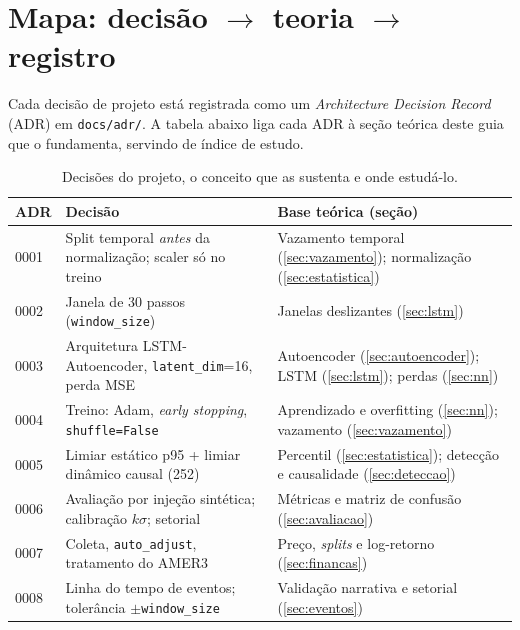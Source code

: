 \section{Mapa: decisão $\to$ teoria $\to$ registro}
\label{sec:mapa}

Cada decisão de projeto está registrada como um \emph{Architecture Decision
Record} (ADR) em \texttt{docs/adr/}. A tabela abaixo liga cada ADR à seção
teórica deste guia que o fundamenta, servindo de índice de estudo.

\begin{table}[h]
\centering
\caption{Decisões do projeto, o conceito que as sustenta e onde estudá-lo.}
\label{tab:mapa}
\renewcommand{\arraystretch}{1.25}
\begin{tabular}{p{1.4cm} p{6.2cm} p{5.2cm}}
\toprule
\textbf{ADR} & \textbf{Decisão} & \textbf{Base teórica (seção)} \\
\midrule
0001 & Split temporal \emph{antes} da normalização; scaler só no treino &
Vazamento temporal (\ref{sec:vazamento}); normalização (\ref{sec:estatistica}) \\
0002 & Janela de 30 passos (\texttt{window\_size}) &
Janelas deslizantes (\ref{sec:lstm}) \\
0003 & Arquitetura LSTM-Autoencoder, \texttt{latent\_dim}=16, perda MSE &
Autoencoder (\ref{sec:autoencoder}); LSTM (\ref{sec:lstm}); perdas (\ref{sec:nn}) \\
0004 & Treino: Adam, \emph{early stopping}, \texttt{shuffle=False} &
Aprendizado e overfitting (\ref{sec:nn}); vazamento (\ref{sec:vazamento}) \\
0005 & Limiar estático p95 + limiar dinâmico causal (252) &
Percentil (\ref{sec:estatistica}); detecção e causalidade (\ref{sec:deteccao}) \\
0006 & Avaliação por injeção sintética; calibração $k\sigma$; setorial &
Métricas e matriz de confusão (\ref{sec:avaliacao}) \\
0007 & Coleta, \texttt{auto\_adjust}, tratamento do AMER3 &
Preço, \emph{splits} e log-retorno (\ref{sec:financas}) \\
0008 & Linha do tempo de eventos; tolerância $\pm$\texttt{window\_size} &
Validação narrativa e setorial (\ref{sec:eventos}) \\
\bottomrule
\end{tabular}
\end{table}

